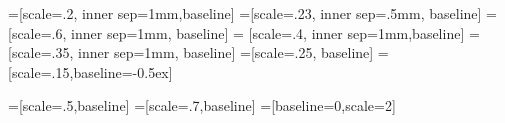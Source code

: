 \documentclass[ aspectratio=169,  12pt,blue,xcolor=pdftex,dvipsnames,table,handout,notes]{beamer}
\begin{document}
=[scale=.2, inner sep=1mm,baseline]
=[scale=.23, inner sep=.5mm, baseline]
=[scale=.6, inner sep=1mm, baseline]
= [scale=.4, inner sep=1mm,baseline] 
=[scale=.35, inner sep=1mm, baseline]
=[scale=.25, baseline]
=[scale=.15,baseline=-0.5ex]

=[scale=.5,baseline]
=[scale=.7,baseline]
=[baseline=0,scale=2]
























		\begin{frame}[plain]

			\centering
			\scalebox{4}{flowchart}
	
		\end{frame}
\end{document}
